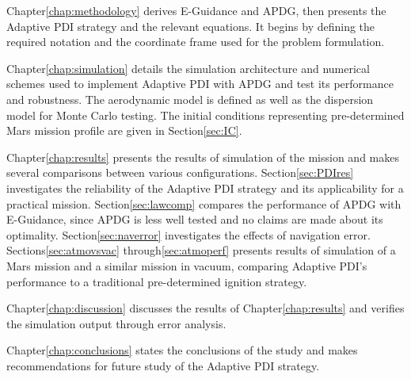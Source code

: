 Chapter\:\ref{chap:methodology} derives E-Guidance and APDG, then presents the Adaptive PDI strategy and the relevant equations. It begins by defining the required notation and the coordinate frame used for the problem formulation.

Chapter\:\ref{chap:simulation} details the simulation architecture and numerical schemes used to implement Adaptive PDI with APDG and test its performance and robustness. The aerodynamic model is defined as well as the dispersion model for Monte Carlo testing. The initial conditions representing pre-determined Mars mission profile are given in Section\:\ref{sec:IC}.

Chapter\:\ref{chap:results} presents the results of simulation of the mission and makes several comparisons between various configurations. Section\:\ref{sec:PDIres} investigates the reliability of the Adaptive PDI strategy and its applicability for a practical mission. Section\:\ref{sec:lawcomp} compares the performance of APDG with E-Guidance, since APDG is less well tested and no claims are made about its optimality. Section\:\ref{sec:naverror} investigates the effects of navigation error. Sections\:\ref{sec:atmovsvac} through\:\ref{sec:atmoperf} presents results of simulation of a Mars mission and a similar mission in vacuum, comparing Adaptive PDI's performance to a traditional pre-determined ignition strategy. 

Chapter\:\ref{chap:discussion} discusses the results of Chapter\:\ref{chap:results} and verifies the simulation output through error analysis.

Chapter\:\ref{chap:conclusions} states the conclusions of the study and makes recommendations for future study of the Adaptive PDI strategy.


